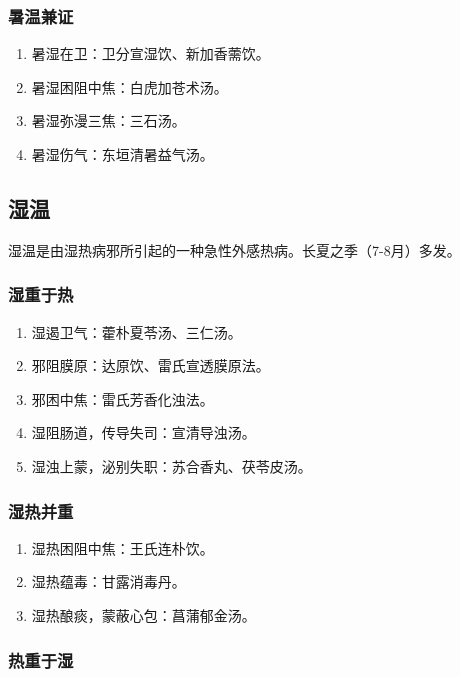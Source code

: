 \documentclass[cn,black,12pt,founder,normal,twocolumn]{elegantnote}
\begin{document}
\subsubsection{暑温兼证}

\begin{enumerate}
    \item 暑湿在卫：卫分宣湿饮、新加香薷饮。
    \item 暑湿困阻中焦：白虎加苍术汤。
    \item 暑湿弥漫三焦：三石汤。
    \item 暑湿伤气：东垣清暑益气汤。
\end{enumerate}

\subsection{湿温}

湿温是由湿热病邪所引起的一种急性外感热病。长夏之季（7-8月）多发。

\subsubsection{湿重于热}

\begin{enumerate}
    \item 湿遏卫气：藿朴夏苓汤、三仁汤。
    \item 邪阻膜原：达原饮、雷氏宣透膜原法。
    \item 邪困中焦：雷氏芳香化浊法。
    \item 湿阻肠道，传导失司：宣清导浊汤。
    \item 湿浊上蒙，泌别失职：苏合香丸、茯苓皮汤。
\end{enumerate}

\subsubsection{湿热并重}

\begin{enumerate}
    \item 湿热困阻中焦：王氏连朴饮。
    \item 湿热蕴毒：甘露消毒丹。
    \item 湿热酿痰，蒙蔽心包：菖蒲郁金汤。
\end{enumerate}

\subsubsection{热重于湿}
\end{document}

